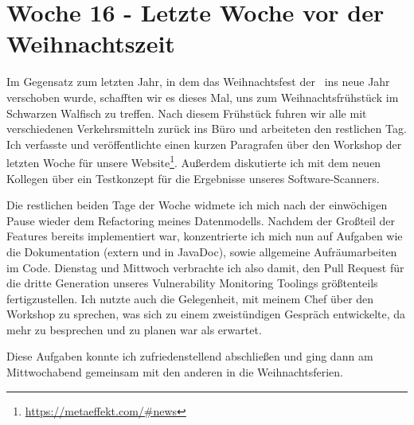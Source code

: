 \section{Woche 16 - Letzte Woche vor der Weihnachtszeit} \label{sec:bericht-wo-16-initial}


\lweekdaymarginpar{\weekdayMondayLong}

Im Gegensatz zum letzten Jahr, in dem das Weihnachtsfest der \metaeffekt\ ins neue Jahr verschoben wurde, schafften wir es dieses Mal, uns zum Weihnachtsfrühstück im Schwarzen Walfisch zu treffen.
Nach diesem Frühstück fuhren wir alle mit verschiedenen Verkehrsmitteln zurück ins Büro und arbeiteten den restlichen Tag.
Ich verfasste und veröffentlichte einen kurzen Paragrafen über den Workshop der letzten Woche für unsere Website\footnote{\url{https://metaeffekt.com/\#news}}.
Außerdem diskutierte ich mit dem neuen Kollegen über ein Testkonzept für die Ergebnisse unseres Software-Scanners.

\sweekdaymarginpar{\weekdayTuesdayShort, \weekdayWednesdayShort}

Die restlichen beiden Tage der Woche widmete ich mich nach der einwöchigen Pause wieder dem Refactoring meines Datenmodells.
Nachdem der Großteil der Features bereits implementiert war, konzentrierte ich mich nun auf Aufgaben wie die Dokumentation (extern und in JavaDoc), sowie allgemeine Aufräumarbeiten im Code.
Dienstag und Mittwoch verbrachte ich also damit, den Pull Request für die dritte Generation unseres Vulnerability Monitoring Toolings größtenteils fertigzustellen.
Ich nutzte auch die Gelegenheit, mit meinem Chef über den Workshop zu sprechen, was sich zu einem zweistündigen Gespräch entwickelte, da mehr zu besprechen und zu planen war als erwartet.

Diese Aufgaben konnte ich zufriedenstellend abschließen und ging dann am Mittwochabend gemeinsam mit den anderen in die Weihnachtsferien.
